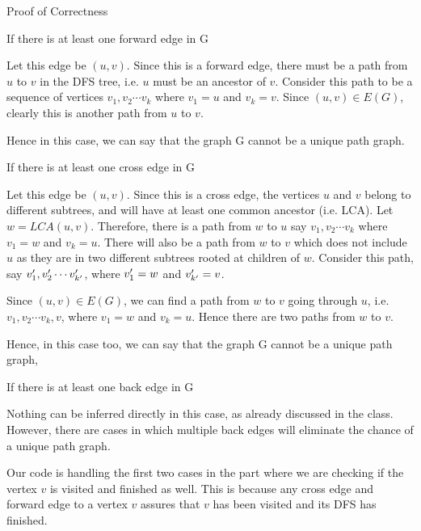 \documentclass{article}
\begin{document}
\begin{question}
\begin{qsection}{Proof of Correctness}
		\begin{qcase}{1}{If there is at least one forward edge in G}

			Let this edge be $(u, v)$. Since this is a forward edge, there must be a path from $u$ to $v$ in the DFS tree, i.e. $u$ must be an ancestor of $v$. Consider this path to be a sequence of vertices $v_1, v_2 \cdots v_k$ where $v_1 = u$ and $v_k = v$. Since $(u, v) \in E(G)$, clearly this is another path from $u$ to $v$. \br\

			Hence in this case, we can say that the graph G cannot be a unique path graph.

		\end{qcase}

		\begin{qcase}{2}{If there is at least one cross edge in G}

			Let this edge be $(u, v)$. Since this is a cross edge, the vertices $u$ and $v$ belong to different subtrees, and will have at least one common ancestor (i.e. LCA). Let $w = LCA(u, v)$. Therefore, there is a path from $w$ to $u$ say $v_1, v_2 \cdots v_k$ where $v_1 = w$ and $v_k = u$. There will also be a path from $w$ to $v$ which does not include $u$ as they are in two different subtrees rooted at children of $w$. Consider this path, say $v^{\prime}_1, v^{\prime}_2 \cdots v^{\prime}_{k^{\prime}}$, where $v^{\prime}_1 = w$ and $v^{\prime}_{k^{\prime}} = v$. \br\
			
			Since $(u, v) \in E(G)$, we can find a path from $w$ to $v$ going through $u$, i.e. $v_1, v_2 \cdots v_k, v$, where $v_1 = w$ and $v_k = u$. Hence there are two paths from $w$ to $v$. \br\

			Hence, in this case too, we can say that the graph G cannot be a unique path graph,
			
		\end{qcase}

		\begin{qcase}{3}{If there is at least one back edge in G}

			Nothing can be inferred directly in this case, as already discussed in the class. However, there are cases in which multiple back edges will eliminate the chance of a unique path graph.
			
		\end{qcase}

		Our code is handling the first two cases in the part where we are checking if the vertex $v$ is visited and finished as well. This is because any cross edge and forward edge to a vertex $v$ assures that $v$ has been visited and its DFS has finished. \br\


\end{qsection}
\end{question}
\end{document}
